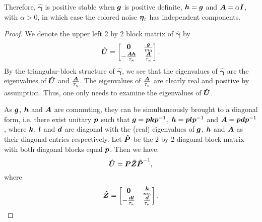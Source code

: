 \begin{remark}
Therefore, $\boldsymbol{\hat{\gamma}}$ is positive stable when $\boldsymbol{g}$ is positive definite, $\boldsymbol{h} = \boldsymbol{g}$  and $\boldsymbol{A} = \alpha \boldsymbol{I}$, with $\alpha > 0$, in which case the colored noise $\boldsymbol{\eta}_{t}$ has independent components.
\end{remark}


\begin{proof}  We denote the upper left 2 by 2 block matrix of $\boldsymbol{\hat{\gamma}}$ by 
\begin{equation}\boldsymbol{\hat{U}} = \begin{bmatrix}
       \boldsymbol{0}  & \frac{\boldsymbol{g}}{m_{0}}  \\ 
       -\frac{\boldsymbol{A} \boldsymbol{h}}{\tau_{\kappa}}  & \frac{\boldsymbol{A}}{\tau_{\kappa}}   \\
     \end{bmatrix}. \end{equation}
By the triangular-block structure of $\boldsymbol{\hat{\gamma}}$, we see that the eigenvalues of  $\boldsymbol{\hat{\gamma}}$ are the eigenvalues of $\boldsymbol{\hat{U}}$ and $\frac{\boldsymbol{A}}{\tau_{\eta}}$. The eigenvalues of $\frac{\boldsymbol{A}}{\tau_{\eta}}$ are clearly real and positive by assumption. Thus, one only needs to examine the eigenvalues of $\boldsymbol{\hat{U}}$. 

As $\boldsymbol{g}$, $\boldsymbol{h}$ and $\boldsymbol{A}$ are commuting, they can be simultaneously brought to a diagonal form, i.e. there exist unitary $\boldsymbol{p}$ such that  $\boldsymbol{g} = \boldsymbol{p} \boldsymbol{k} \boldsymbol{p}^{-1}$, $\boldsymbol{h} = \boldsymbol{p} \boldsymbol{l} \boldsymbol{p}^{-1}$ and $\boldsymbol{A} = \boldsymbol{p} \boldsymbol{d} \boldsymbol{p}^{-1}$, where  $\boldsymbol{k}$, $\boldsymbol{l}$ and $\boldsymbol{d}$ are diagonal with the (real) eigenvalues of $\boldsymbol{g}$, $\boldsymbol{h}$ and $\boldsymbol{A}$ as their diagonal entries respectively. Let $\boldsymbol{\hat{P}}$ be the 2 by 2 diagonal block matrix with both diagonal blocks equal $\boldsymbol{p}$. Then we have: \begin{equation}\boldsymbol{\hat{U}}=\boldsymbol{P}\boldsymbol{\hat{Z}}\boldsymbol{\hat{P}}^{-1}, \end{equation} where \begin{equation}\boldsymbol{\hat{Z}} = \begin{bmatrix}
       \boldsymbol{0}  & \frac{\boldsymbol{k}}{m_{0}}  \\ 
       -\frac{\boldsymbol{d}  \boldsymbol{l}}{\tau_{\kappa}} & \frac{\boldsymbol{d}}{\tau_{\kappa}}   \\
     \end{bmatrix}. \end{equation}
     

\end{proof}
